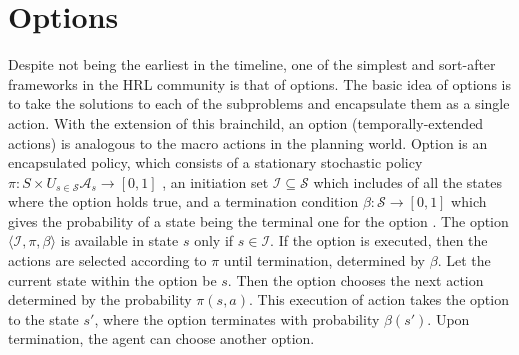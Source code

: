 \section{Options}

Despite not being the earliest in the timeline, one of the simplest and sort-after frameworks in the HRL community is that of options. The basic idea of options is to take the solutions to each of the subproblems and encapsulate them as a single action. With the extension of this brainchild, an option (temporally-extended actions) is analogous to the macro actions in the planning world. Option is an encapsulated policy, which consists of a stationary stochastic policy \(\pi:S \times U_{s \in \mathcal{S}}  \mathcal{A}_s \rightarrow [0,1]\) , an initiation set \(\mathcal{I} \subseteq  \mathcal{S}\) which includes of all the states where the option holds true, and a termination condition \(\beta:\mathcal{S} \rightarrow [0,1]\) which gives the probability of a state being the terminal one for the option \cite{Sutton}. The option \( \langle \mathcal{I},\pi,\beta \rangle \) is available in state \(s\) only if \(s \in \mathcal{I} \). If the option is executed, then the actions are selected according to \(\pi\) until termination, determined by \(\beta\). Let the current state within the option be \(s\). Then the option chooses the next action determined by the probability \(\pi(s,a)\). This execution of action takes the option to the state \(s'\), where the option terminates with probability \(\beta(s')\). Upon termination, the agent can choose another option. 

\iffalse
Consider a humanoid robot which has the task of opening the door to exit a room. This problem can further have subproblems like reaching, grasping and turning the knob. The initiation set considers of all the states where the agent is inside the room. Actions include navigating within the room, grasping the door knob and turning it to leave the room. The policies determine the ways to navigate through this small world. On exiting the room, \(\beta(s)=1\), which is the only terminal state for this example. This option can further be a part of any larger problem. In other words, options can act as actions within another option. These chain of options gives the hierarchy. Thus, in HRL a set of options replaces the set of actions. \\
\fi

